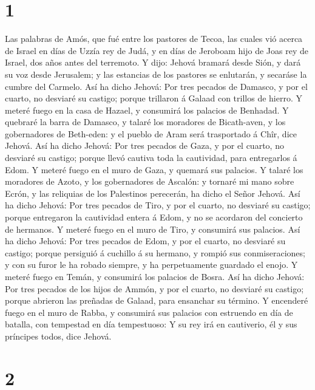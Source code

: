 \hypertarget{section}{%
\section{1}\label{section}}

 Las palabras de Amós, que fué entre los pastores de Tecoa,
las cuales vió acerca de Israel en días de Uzzía rey de Judá, y en días
de Jeroboam hijo de Joas rey de Israel, dos años antes del terremoto.
 Y dijo: Jehová bramará desde Sión, y dará su voz desde
Jerusalem; y las estancias de los pastores se enlutarán, y secaráse la
cumbre del Carmelo.  Así ha dicho Jehová: Por tres pecados
de Damasco, y por el cuarto, no desviaré su castigo; porque trillaron á
Galaad con trillos de hierro.  Y meteré fuego en la casa de
Hazael, y consumirá los palacios de Benhadad.  Y quebraré la
barra de Damasco, y talaré los moradores de Bicath-aven, y los
gobernadores de Beth-eden: y el pueblo de Aram será trasportado á Chîr,
dice Jehová.  Así ha dicho Jehová: Por tres pecados de Gaza,
y por el cuarto, no desviaré su castigo; porque llevó cautiva toda la
cautividad, para entregarlos á Edom.  Y meteré fuego en el
muro de Gaza, y quemará sus palacios.  Y talaré los
moradores de Azoto, y los gobernadores de Ascalón: y tornaré mi mano
sobre Ecrón, y las reliquias de los Palestinos perecerán, ha dicho el
Señor Jehová.  Así ha dicho Jehová: Por tres pecados de
Tiro, y por el cuarto, no desviaré su castigo; porque entregaron la
cautividad entera á Edom, y no se acordaron del concierto de hermanos.
 Y meteré fuego en el muro de Tiro, y consumirá sus
palacios.  Así ha dicho Jehová: Por tres pecados de Edom, y
por el cuarto, no desviaré su castigo; porque persiguió á cuchillo á su
hermano, y rompió sus conmiseraciones; y con su furor le ha robado
siempre, y ha perpetuamente guardado el enojo.  Y meteré
fuego en Temán, y consumirá los palacios de Bosra.  Así ha
dicho Jehová: Por tres pecados de los hijos de Ammón, y por el cuarto,
no desviaré su castigo; porque abrieron las preñadas de Galaad, para
ensanchar su término.  Y encenderé fuego en el muro de
Rabba, y consumirá sus palacios con estruendo en día de batalla, con
tempestad en día tempestuoso:  Y su rey irá en cautiverio,
él y sus príncipes todos, dice Jehová.

\hypertarget{section-1}{%
\section{2}\label{section-1}}

